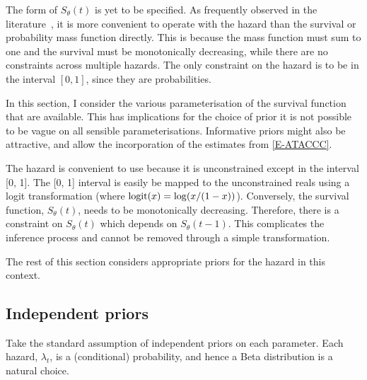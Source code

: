 \documentclass[thesis.tex]{subfiles}
\begin{document}
The form of $S_\theta(t)$ is yet to be specified.
As frequently observed in the literature~\autocite[e.g.:][]{heBayesian}, it is more convenient to operate with the hazard than the survival or probability mass function directly.
This is because the mass function must sum to one and the survival must be monotonically decreasing, while there are no constraints across multiple hazards.
The only constraint on the hazard is to be in the interval $[0, 1]$, since they are probabilities.

In this section, I consider the various parameterisation of the survival function that are available.
This has implications for the choice of prior it is not possible to be vague on all sensible parameterisations.
Informative priors might also be attractive, and allow the incorporation of the estimates from \cref{E-ATACCC}.

The hazard is convenient to use because it is unconstrained except in the interval [0, 1].
The [0, 1] interval is easily be mapped to the unconstrained reals using a logit transformation (where $\operatorname{logit}(x) = \log(x/(1-x))$).
Conversely, the survival function, $S_\theta(t)$, needs to be monotonically decreasing.
Therefore, there is a constraint on $S_\theta(t)$ which depends on $S_\theta(t-1)$.
This complicates the inference process and cannot be removed through a simple transformation.

The rest of this section considers appropriate priors for the hazard in this context.

\subsection{Independent priors} \label{perf-test:sec:independent-priors}
Take the standard assumption of independent priors on each parameter.
Each hazard, $\lambda_t$, is a (conditional) probability, and hence a Beta distribution is a natural choice.
\end{document}

